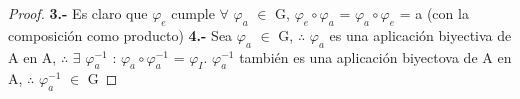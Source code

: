 \documentclass[10pt,a4paper,oneside]{article}
\begin{document}
\begin{proof}
				\textbf{3.-}
				Es claro que $\varphi_{e}$ cumple $\forall$ $\varphi_{a}$ $\in$ G, $\varphi_{e}\circ\varphi_{a}$ = $\varphi_{a}\circ\varphi_{e}$ = a (con la composición como producto)
				\newline
				\newline
				\textbf{4.-}
				Sea $\varphi_{a}$ $\in$ G, $\therefore$ $\varphi_{a}$ es una aplicación biyectiva de A en A, $\therefore$ $\exists$ $\varphi_{a}^{-1}$ : $\varphi_{a}\circ\varphi_{a}^{-1}$ = $\varphi_{I}$. $\varphi_{a}^{-1}$ también es una aplicación biyectova de A en A, $\therefore$ $\varphi_{a}^{-1}$ $\in$ G
				\newline

			\end{proof}
\end{document}
